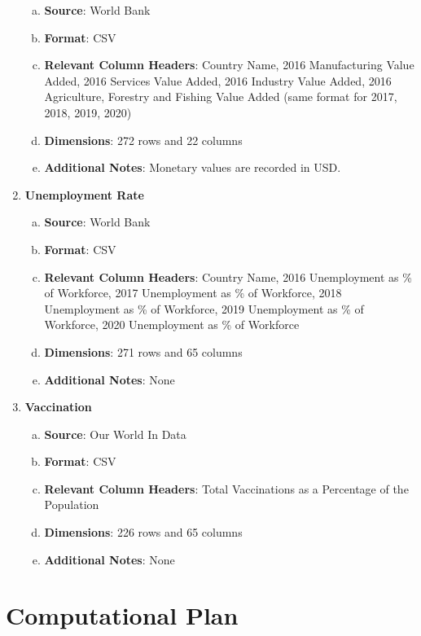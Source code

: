 \documentclass[fontsize=11pt]{article}
\begin{document}
\begin{enumerate}
\begin{enumerate}[(a)]
            \item \textbf{Source}: World Bank
            \item \textbf{Format}: CSV
            \item \textbf{Relevant Column Headers}: Country Name, 2016 Manufacturing Value Added, 2016 Services Value Added, 2016 Industry Value Added, 2016 Agriculture, Forestry and Fishing Value Added (same format for 2017, 2018, 2019, 2020)
            \item \textbf{Dimensions}: 272 rows and 22 columns
            \item \textbf{Additional Notes}: Monetary values are recorded in USD.
        \end{enumerate}
    \item \textbf{Unemployment Rate}
        \begin{enumerate}[(a)]
            \item \textbf{Source}: World Bank
            \item \textbf{Format}: CSV
            \item \textbf{Relevant Column Headers}: Country Name, 2016 Unemployment as \% of Workforce, 2017 Unemployment as \% of Workforce, 2018 Unemployment as \% of Workforce, 2019 Unemployment as \% of Workforce, 2020 Unemployment as \% of Workforce
            \item \textbf{Dimensions}: 271 rows and 65 columns
            \item \textbf{Additional Notes}: None
        \end{enumerate}
    \item \textbf{Vaccination}
        \begin{enumerate}[(a)]
            \item \textbf{Source}: Our World In Data
            \item \textbf{Format}: CSV
            \item \textbf{Relevant Column Headers}: Total Vaccinations as a Percentage of the Population
            \item \textbf{Dimensions}: 226 rows and 65 columns
            \item \textbf{Additional Notes}: None
        \end{enumerate}
\end{enumerate}

\section*{Computational Plan}
\end{document}
